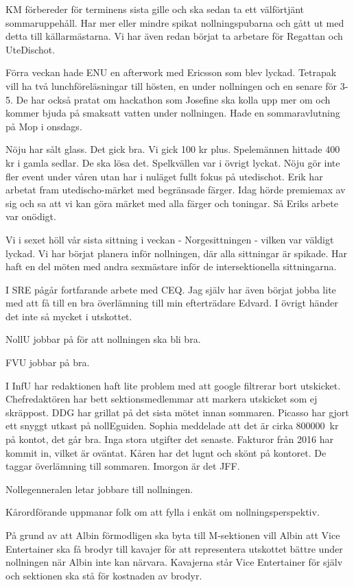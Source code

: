 \documentclass[10pt]{article}
\begin{document}
\begin{paragrafer}
\begin{paragrafer}
KM förbereder för terminens sista gille och ska sedan ta ett välförtjänt sommaruppehåll. Har mer eller mindre spikat nollningspubarna och gått ut med detta till källarmästarna. Vi har även redan börjat ta arbetare för Regattan och UteDischot.

Förra veckan hade ENU en afterwork med Ericsson som blev lyckad. Tetrapak vill ha två lunchföreläsningar till hösten, en under nollningen och en senare för 3-5. De har också pratat om hackathon som Josefine ska kolla upp mer om och kommer bjuda på smaksatt vatten under nollningen. Hade en sommaravlutning på Mop i onsdags.

Nöju har sålt glass. Det gick bra. Vi gick 100 kr plus. Spelemännen hittade 400 kr i gamla sedlar. De ska lösa det. Spelkvällen var i övrigt lyckat. Nöju gör inte fler event under våren utan har i nuläget fullt fokus på utedischot. Erik har arbetat fram utedischo-märket med begränsade färger. Idag hörde premiemax av sig och sa att vi kan göra märket med alla färger och toningar. Så Eriks arbete var onödigt.

Vi i sexet höll vår sista sittning i veckan - Norgesittningen - vilken var väldigt lyckad. Vi har börjat planera inför nollningen, där alla sittningar är spikade. Har haft en del möten med andra sexmästare inför de intersektionella sittningarna.

I SRE pågår fortfarande arbete med CEQ. Jag själv har även börjat jobba lite med att få till en bra överlämning till min efterträdare Edvard. I övrigt händer det inte så mycket i utskottet.

NollU jobbar på för att nollningen ska bli bra.

FVU jobbar på bra.

I InfU har redaktionen haft lite problem med att google filtrerar bort utskicket. Chefredaktören har bett sektionsmedlemmar att markera utskicket som ej skräppost. DDG har grillat på det sista mötet innan sommaren. Picasso har gjort ett snyggt utkast på nollEguiden.
Sophia meddelade att det är cirka \SI{800000}{kr} på kontot, det går bra. Inga stora utgifter det senaste. Fakturor från 2016 har kommit in, vilket är oväntat.
Kåren har det lugnt och skönt på kontoret. De taggar överlämning till sommaren. Imorgon är det JFF.

Nollegenneralen letar jobbare till nollningen.

Kårordförande uppmanar folk om att fylla i enkät om nollningsperspektiv.
\end{paragrafer}
På grund av att Albin förmodligen ska byta till M-sektionen vill Albin att Vice Entertainer ska få brodyr till kavajer för att representera utskottet bättre under nollningen när Albin inte kan närvara. Kavajerna står Vice Entertainer för själv och sektionen ska stå för kostnaden av brodyr.


\end{paragrafer}
\end{document}
